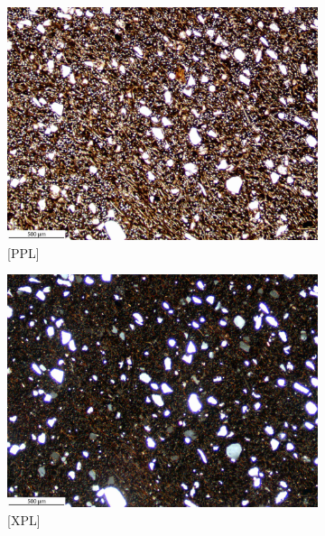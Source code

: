 \documentclass[a4paper]{article}
\begin{document}
\begin{figure}[H]
	\centering
	\begin{subfigure}[t]{.49\textwidth}
		\includegraphics[width=\textwidth]{ThinSections/53-1_4x_PPL.jpg}
		\caption{[PPL]}
	\end{subfigure}\hspace{.5em}\hfill
	\begin{subfigure}[t]{.49\textwidth}
		\includegraphics[width=\textwidth]{ThinSections/53-1_4x_XPL.jpg}
		\caption{[XPL]}
	\end{subfigure}
	\begin{subfigure}[t]{.32\textwidth}

\end{subfigure}
\end{figure}
\end{document}
